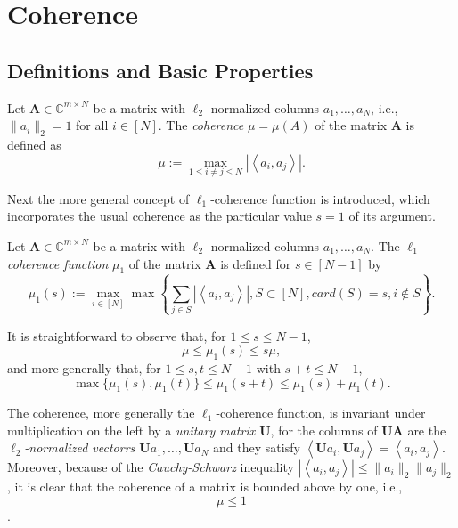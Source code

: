 \chapter{Coherence}
\section{Definitions and Basic Properties}

\begin{definition}
    \label{def1.1}
    Let $\mathbf{A} \in \mathbb{C}^{m \times N}$ be a matrix with $\ell_2$-normalized columns $a_1,\dots,a_N$, i.e., $\|a_i\|_2=1$ for all $i \in [N]$. The \emph{coherence} $\mu = \mu(A)$ of the matrix $\mathbf{A}$ is defined as
    \begin{equation}
        \mu := \max\limits_{1 \leq i \neq j \leq N} \left|\left<a_i,a_j\right>\right|.
        \label{eq1.1}
    \end{equation}
\end{definition}

Next the more general concept of $\ell_1$-coherence function is introduced, which incorporates the usual coherence as the particular value $s=1$ of its argument.

\begin{definition}
    \label{def1.2}
    Let $\mathbf{A} \in \mathbb{C}^{m \times N}$ be a matrix with $\ell_2$-normalized columns $a_1,\dots,a_N$. The $\ell_1$-\emph{coherence function} $\mu_1$ of the matrix $\mathbf{A}$ is defined for $s \in [N-1]$ by
    \begin{equation*}
        \mu_1(s) := \max\limits_{i \in [N]} \max\left\{\sum\limits_{j \in S}\left|\left<a_i,a_j\right>\right|, S \subset [N], card(S) = s, i \notin S \right\}. 
    \end{equation*}
\end{definition}

It is straightforward to observe that, for $1 \leq s \leq N-1$,
\begin{equation}
    \mu \leq \mu_1(s) \leq s\mu,
    \label{eq1.2}
\end{equation}
and more generally that, for $1 \leq s, t \leq N-1$ with $s+t \leq N-1$,
\begin{equation}
    \max \{\mu_1(s), \mu_1(t)\} \leq \mu_1(s+t) \leq \mu_1(s) + \mu_1(t).
    \label{eq1.3}
\end{equation}

The coherence, more generally the $\ell_1$-coherence function, is invariant under multiplication on the left by a \emph{\textcolor[rgb]{1,0,0}{unitary matrix $\mathbf{U}$}}, for the columns of $\mathbf{UA}$ are the \emph{\textcolor[rgb]{1,0,0}{$\ell_2$-normalized vectorrs $\mathbf{U}a_1,\dots,\mathbf{U}a_N$}} and they satisfy $\left<\mathbf{U}a_i,\mathbf{U}a_j\right> = \left<a_i,a_j\right>$. Moreover, because of the \emph{Cauchy-Schwarz} inequality $\left|\left<a_i,a_j\right>\right| \leq \|a_i\|_2\|a_j\|_2$, it is clear that the coherence of a matrix is bounded above by one, i.e.,
\[\mu \leq 1\].

